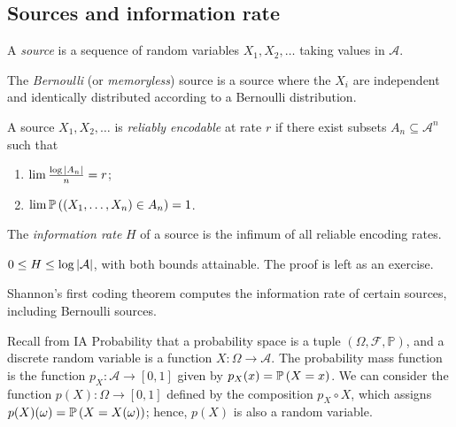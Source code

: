 \subsection{Sources and information rate}
\begin{definition}
    A \emph{source} is a sequence of random variables \( X_1, X_2, \dots \) taking values in \( \mathcal A \).
\end{definition}
\begin{example}
    The \emph{Bernoulli} (or \emph{memoryless}) source is a source where the \( X_i \) are independent and identically distributed according to a Bernoulli distribution.
\end{example}
\begin{definition}
    A source \( X_1, X_2, \dots \) is \emph{reliably encodable} at rate \( r \) if there exist subsets \( A_n \subseteq \mathcal A^n \) such that
    \begin{enumerate}
        \item \( \lim \frac{\log \abs{A_n}}{n} = r \);
        \item \( \lim \mathbb{P}\left({(X_1, \dots, X_n) \in A_n}\right) = 1 \).
    \end{enumerate}
\end{definition}
\begin{definition}
    The \emph{information rate} \( H \) of a source is the infimum of all reliable encoding rates.
\end{definition}
\begin{example}
    \( 0 \leq H \leq \log\abs{\mathcal A} \), with both bounds attainable.
    The proof is left as an exercise.
\end{example}
Shannon's first coding theorem computes the information rate of certain sources, including Bernoulli sources.

Recall from IA Probability that a probability space is a tuple \( (\Omega, \mathcal F, \mathbb P) \), and a discrete random variable is a function \( X \colon \Omega \to \mathcal A \).
The probability mass function is the function \( p_X \colon \mathcal A \to [0,1] \) given by \( p_X(x) = \mathbb{P}\left({X = x}\right) \).
We can consider the function \( p(X) \colon \Omega \to [0,1] \) defined by the composition \( p_X \circ X \), which assigns \( p(X)(\omega) = \mathbb{P}\left({X = X(\omega)}\right) \); hence, \( p(X) \) is also a random variable.

